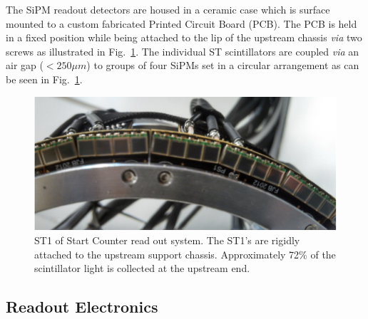 The SiPM readout detectors are housed in a ceramic case which is surface mounted to a custom fabricated Printed Circuit Board (PCB).  The PCB is held in a fixed position while being attached to the lip of the upstream chassis \emph{via} two screws as illustrated in Fig.~\ref{fig:st1_mounted}.  The individual ST scintillators are coupled \emph{via} an air gap ($< 250 \mu m$) to groups of four SiPMs set in a circular arrangement as can be seen in Fig.~\ref{fig:st1_mounted}.
	\begin{figure}[!htb]
		\centering
		\includegraphics[width=1.0\columnwidth]{design/figs/st1_mounted}
		\caption{ST1 of Start Counter read out system. The ST1's are rigidly attached to the upstream support chassis.  Approximately 72\% of the scintillator light is collected at the upstream end.}
		\label{fig:st1_mounted}
	\end{figure}

\subsection{Readout Electronics} \label{sec:design_electronics}

